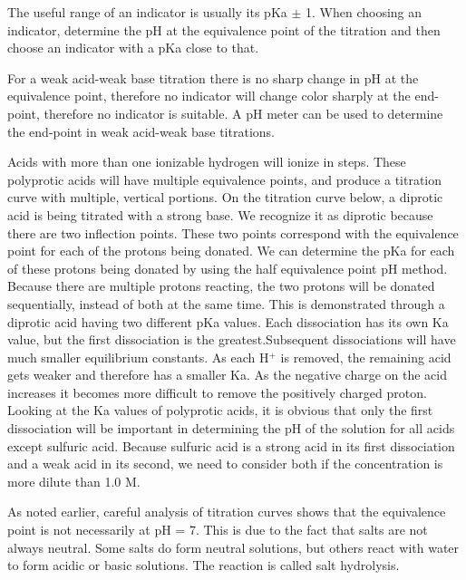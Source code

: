\documentclass[../chem.tex]{subfiles}
\begin{document}
The useful range of an indicator is usually its pKa $\pm$ 1. When choosing an indicator, determine the pH at the equivalence point of the 
titration and then choose an indicator with a pKa close to that.

For a weak acid-weak base titration there is no sharp change in pH at the equivalence point, therefore no indicator will change color sharply 
at the end-point, therefore no indicator is suitable. A pH meter can be used to determine the end-point in weak acid-weak base titrations.

Acids with more than one ionizable hydrogen will ionize in steps. These polyprotic acids will have multiple equivalence points, and produce a titration curve with multiple, 
vertical portions. On the titration curve below, a diprotic acid is being titrated with a strong base. We recognize it as diprotic because there are two inflection points.
These two points correspond with the equivalence point for each of the protons being donated. We can determine the pKa for each of these protons being donated by using the half equivalence 
point pH method. Because there are multiple protons reacting, the two protons will be donated sequentially, instead of both at the same time. This is demonstrated through a 
diprotic acid having two different pKa values. Each dissociation has its own Ka value, but the first dissociation is the greatest.Subsequent dissociations 
will have much smaller equilibrium constants. As each H$^+$ is removed, the remaining acid gets weaker and therefore has a smaller Ka. As the negative charge 
on the acid increases it becomes more difficult to remove the positively charged proton. Looking at the Ka values of polyprotic acids, it is obvious 
that only the first dissociation will be important in determining the pH of the solution for all acids except sulfuric acid. Because sulfuric acid is a strong acid 
in its first dissociation and a weak acid in its second, we need to consider both if the concentration is more dilute than 1.0 M.

As noted earlier, careful analysis of titration curves shows that the equivalence point is not necessarily at pH = 7. This is due to the fact that 
salts are not always neutral. Some salts do form neutral solutions, but others react with water to form acidic or basic solutions. The reaction is called 
salt hydrolysis. 
\end{document}
